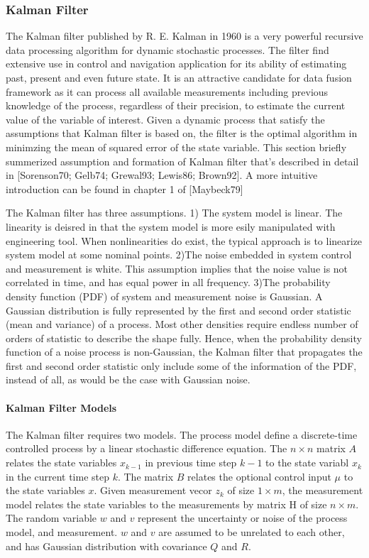 \subsubsection{Kalman Filter}
The Kalman filter \cite{Kalman's original paper}published by R. E.
Kalman in 1960 is a very powerful recursive data processing algorithm
for dynamic stochastic processes. The filter find extensive use in
control and navigation application for its ability of estimating past,
present and even future state. It is an attractive candidate for data
fusion framework as it can process all available measurements
including previous knowledge of the process, regardless of their
precision, to estimate the current value of the variable of interest.
Given a dynamic process that satisfy the assumptions that Kalman
filter is based on, the filter is the optimal algorithm in minimzing
the mean of squared error of the state variable. This section briefly
summerized assumption and formation of Kalman filter that's described
in detail in \cite{from the following}[Sorenson70; Gelb74; Grewal93;
Lewis86; Brown92]. A more intuitive introduction can be found in
chapter 1 of [Maybeck79]

The Kalman filter has three assumptions. 1) The system model is
linear. The linearity is deisred in that the system model is more
esily manipulated with engineering tool. When nonlinearities do exist,
the typical approach is to linearize system model at some nominal
points. 2)The noise embedded in system control and measurement is
white. This assumption implies that the noise value is not correlated
in time, and has equal power in all frequency. 3)The probability
density function (PDF) of system and measurement noise is Gaussian. A
Gaussian distribution is fully represented by the first and second
order statistic (mean and variance) of a process. Most other densities
require endless number of orders of statistic to describe the shape
fully. Hence, when the probability density function of a noise process
is non-Gaussian, the Kalman filter that propagates the first and
second order statistic only include some of the information of the
PDF, instead of all, as would be the case with Gaussian noise.

\paragraph{Kalman Filter Models}
The Kalman filter requires two models. The process model define a
discrete-time controlled process by a linear stochastic difference
equation. The $n\times n$ matrix $A$ relates the state variables
$x_{k-1}$ in previous time step $k-1$ to the state variabl $x_{k}$ in
the current time step $k$. The matrix $B$ relates the optional control
input $\mu$ to the state variables $x$. Given measurement vecor $z_k$
of size $1 \times m$, the measurement model relates the state
variables to the measurements by matrix H of size $n \times m$. The
random variable $w$ and $v$ represent the uncertainty or noise of the
process model, and measurement. $w$ and $v$ are assumed to be
unrelated to each other, and has Gaussian distribution with covariance
$Q$ and $R$. 


